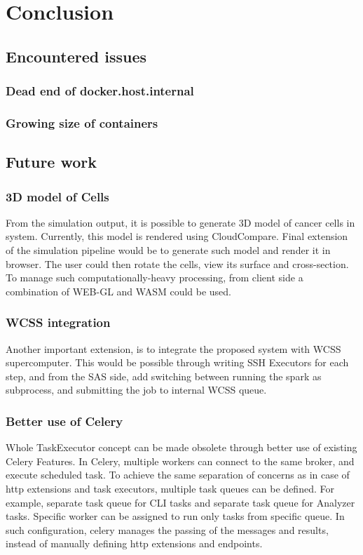 \chapter{Conclusion}
\section{Encountered issues}
\subsection{Dead end of docker.host.internal}
\subsection{Growing size of containers}
\section{Future work}
\subsection{3D model of Cells}
From the simulation output, it is possible to generate 3D model of cancer cells in system. Currently, this model is rendered using CloudCompare. Final extension of the simulation pipeline would be to generate such model and render it in browser. The user could then rotate the cells, view its surface and cross-section. To manage such computationally-heavy processing, from client side a combination of WEB-GL and WASM could be used.
\subsection{WCSS integration}
Another important extension, is to integrate the proposed system with WCSS supercomputer. This would be possible through writing SSH Executors for each step, and from the SAS side, add switching between running the spark as subprocess, and submitting the job to internal WCSS queue.
\subsection{Better use of Celery}
Whole TaskExecutor concept can be made obsolete through better use of existing Celery Features. In Celery, multiple workers can connect to the same broker, and execute scheduled task. To achieve the same separation of concerns as in case of http extensions and task executors, multiple task queues can be defined. For example, separate task queue for CLI tasks and separate task queue for Analyzer tasks. Specific worker can be assigned to run only tasks from specific queue. In such configuration, celery manages the passing of the messages and results, instead of manually defining http extensions and endpoints.
